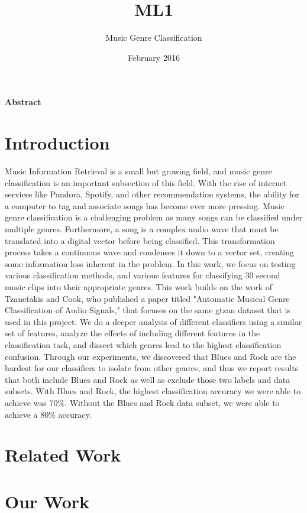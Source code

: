 \documentclass{article}
\title{ML1}
\author{Music Genre Classification}
\date{February 2016}
\begin{document}
\maketitle

\textbf{Abstract}

\section{Introduction}
Music Information Retrieval is a small but growing field, and music genre classification is an important subsection of this field. With the rise of internet services like Pandora, Spotify, and other recommendation systems, the ability for a computer to tag and associate songs has become ever more pressing. Music genre classification is a challenging problem as many songs can be classified under multiple genres. Furthermore, a song is a complex audio wave that must be translated into a digital vector before being classified. This transformation process takes a continuous wave and condenses it down to a vector set, creating some information loss inherent in the problem. In this work, we focus on testing various classification methods, and various features for classifying 30 second music clips into their appropriate genres. This work builds on the work of Tzanetakis and Cook, who published a paper titled "Automatic Musical Genre Classification of Audio Signals," that focuses on the same gtzan dataset that is used in this project. We do a deeper analysis of different classifiers using a similar set of features, analyze the effects of including different features in the classification task, and dissect which genres lead to the highest classification confusion. Through our experiments, we discovered that Blues and Rock are the hardest for our classifiers to isolate from other genres, and thus we report results that both include Blues and Rock as well as exclude those two labels and data subsets. With Blues and Rock, the highest classification accuracy we were able to achieve was 70\%. Without the Blues and Rock data subset, we were able to achieve a 80\% accuracy. 
\section{Related Work}

\section{Our Work}
\end{document}
